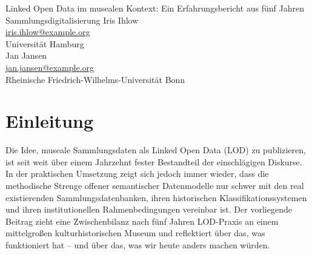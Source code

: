 \graphicspath{{abstracts/praesentationen/05-linked-open-data/img/}{img/}}

\begin{beitrag}{Linked Open Data im musealen Kontext: Ein Erfahrungsbericht aus fünf Jahren Sammlungsdigitalisierung}{%
Iris Ihlow\, \\
\small \href{mailto:iris.ihlow@example.org}{iris.ihlow@example.org} \\
\small Universität Hamburg \\[0.5cm]
Jan Jansen\, \\
\small \href{mailto:jan.jansen@example.org}{jan.jansen@example.org} \\
\small Rheinische Friedrich-Wilhelms-Universität Bonn
}

\begin{abstract}
Der Beitrag zieht eine kritische Bilanz nach fünf Jahren Linked-Open-Data-Praxis an einem mittelgroßen kulturhistorischen Museum mit WissKI: Als zentrale Stärke erwies sich die disziplinierende Wirkung der LOD-Strategie auf die Datenerfassung, während Granularitätsausgleich (gelöst über ein dreigliedriges SKOS-Mapping-Schema), Langzeitstabilität externer Bezugsdaten und institutionelle Verstetigung aufwendiger ausfielen als erwartet. Empfohlen wird, zunächst in die interne Datenqualität zu investieren, bevor eine vorzeitige Publikation einen Soliditätseindruck erzeugt, dem die Datenbasis nicht entspricht; als nächster Schritt ist die Anbindung an das europäische Netzwerk CulturalData.eu geplant.
\end{abstract}

\section{Einleitung}
Die Idee, museale Sammlungsdaten als Linked Open Data (LOD) zu publizieren, ist seit weit über einem Jahrzehnt fester Bestandteil der einschlägigen Diskurse. In der praktischen Umsetzung zeigt sich jedoch immer wieder, dass die methodische Strenge offener semantischer Datenmodelle nur schwer mit den real existierenden Sammlungsdatenbanken, ihren historischen Klassifikationssystemen und ihren institutionellen Rahmenbedingungen vereinbar ist. Der vorliegende Beitrag zieht eine Zwischenbilanz nach fünf Jahren LOD-Praxis an einem mittelgroßen kulturhistorischen Museum und reflektiert über das, was funktioniert hat -- und über das, was wir heute anders machen würden.


\end{beitrag}
